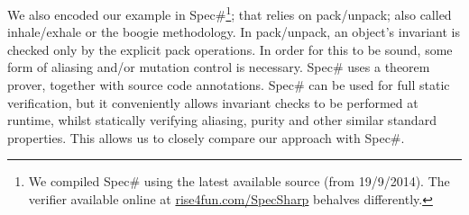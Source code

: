 




We also encoded our example in Spec\#\footnote{We compiled Spec\# using the latest available source (from 19/9/2014). The verifier available online at \url{rise4fun.com/SpecSharp} behalves differently.}; that relies on pack/unpack; also called inhale/exhale or the boogie methodology.
In pack/unpack, an object's invariant is checked only by the explicit pack operations.
In order for this to be sound, some form of aliasing and/or mutation control is necessary. Spec\# uses a theorem prover, together with source code annotations.
Spec\# can be used for full static verification, but it conveniently allows invariant checks to be performed at runtime, whilst statically verifying aliasing, purity and other similar standard properties.
This allows us to closely compare our approach with Spec\#.

